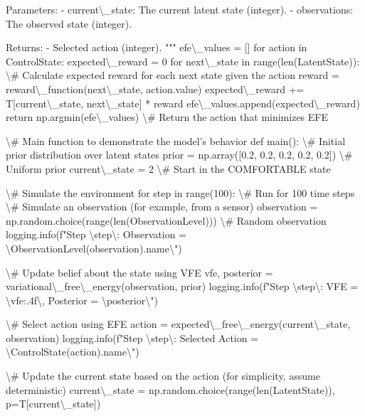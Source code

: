 \documentclass[11pt,a4paper]{article}
\begin{document}
    Parameters:
    - current\textbackslash{}_state: The current latent state (integer).
    - observations: The observed state (integer).
    
    Returns:
    - Selected action (integer).
    """
    efe\textbackslash{}_values = []
    for action in ControlState:
        expected\textbackslash{}_reward = 0
        for next\textbackslash{}_state in range(len(LatentState)):
            \textbackslash{}# Calculate expected reward for each next state given the action
            reward = reward\textbackslash{}_function(next\textbackslash{}_state, action.value)
            expected\textbackslash{}_reward += T[current\textbackslash{}_state, next\textbackslash{}_state] * reward
        efe\textbackslash{}_values.append(expected\textbackslash{}_reward)
    return np.argmin(efe\textbackslash{}_values)  \textbackslash{}# Return the action that minimizes EFE

\textbackslash{}# Main function to demonstrate the model's behavior
def main():
    \textbackslash{}# Initial prior distribution over latent states
    prior = np.array([0.2, 0.2, 0.2, 0.2, 0.2])  \textbackslash{}# Uniform prior
    current\textbackslash{}_state = 2  \textbackslash{}# Start in the COMFORTABLE state

    \textbackslash{}# Simulate the environment
    for step in range(100):  \textbackslash{}# Run for 100 time steps
        \textbackslash{}# Simulate an observation (for example, from a sensor)
        observation = np.random.choice(range(len(ObservationLevel)))  \textbackslash{}# Random observation
        logging.info(f"Step \textbackslash{}{step\textbackslash{}}: Observation = \textbackslash{}{ObservationLevel(observation).name\textbackslash{}}")

        \textbackslash{}# Update belief about the state using VFE
        vfe, posterior = variational\textbackslash{}_free\textbackslash{}_energy(observation, prior)
        logging.info(f"Step \textbackslash{}{step\textbackslash{}}: VFE = \textbackslash{}{vfe:.4f\textbackslash{}}, Posterior = \textbackslash{}{posterior\textbackslash{}}")

        \textbackslash{}# Select action using EFE
        action = expected\textbackslash{}_free\textbackslash{}_energy(current\textbackslash{}_state, observation)
        logging.info(f"Step \textbackslash{}{step\textbackslash{}}: Selected Action = \textbackslash{}{ControlState(action).name\textbackslash{}}")

        \textbackslash{}# Update the current state based on the action (for simplicity, assume deterministic)
        current\textbackslash{}_state = np.random.choice(range(len(LatentState)), p=T[current\textbackslash{}_state])
\end{document}
